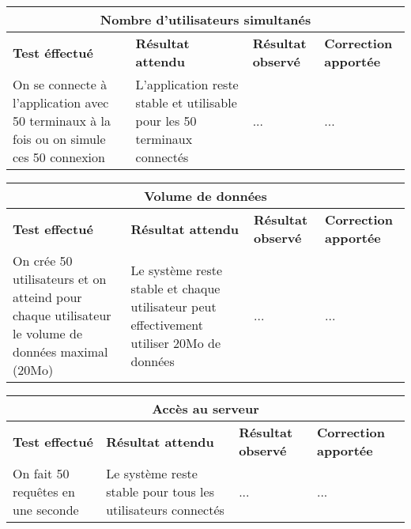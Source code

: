 \documentclass{article}
\begin{document}
  \begin{center}
    \begin{tabular}{|p{4cm}|p{4cm}|p{4cm}|p{4cm}|}
      \hline
      \multicolumn{4}{|c|}{\textbf{Nombre d'utilisateurs simultanés}} \\
      \hline
      \textbf{Test éffectué} & \textbf{Résultat attendu} & \textbf{Résultat observé} & \textbf{Correction apportée} \\
      \hline

      On se connecte à l'application avec 50 terminaux à la fois ou on simule ces 50 connexion&
      L'application reste stable et utilisable pour les 50 terminaux connectés&
      ...&
      ... \\


      \hline

    \end{tabular}
  \end{center}

  \begin{center}
    \begin{tabular}{|p{4cm}|p{4cm}|p{4cm}|p{4cm}|}
      \hline
      \multicolumn{4}{|c|}{\textbf{Volume de données}} \\
      \hline
      \textbf{Test effectué} & \textbf{Résultat attendu} & \textbf{Résultat observé} & \textbf{Correction apportée} \\
      \hline

      On crée 50 utilisateurs et on atteind pour chaque utilisateur le volume de données maximal (20Mo)&
      Le système reste stable et chaque utilisateur peut effectivement utiliser 20Mo de données&
      ...&
      ... \\


      \hline

    \end{tabular}
  \end{center}

  \begin{center}
    \begin{tabular}{|p{4cm}|p{4cm}|p{4cm}|p{4cm}|}
      \hline
      \multicolumn{4}{|c|}{\textbf{Accès au serveur}} \\
      \hline
      \textbf{Test effectué} & \textbf{Résultat attendu} & \textbf{Résultat observé} & \textbf{Correction apportée} \\
      \hline

      On fait 50 requêtes en une seconde&
      Le système reste stable pour tous les utilisateurs connectés&
      ...&
      ... \\


      \hline

    \end{tabular}
  \end{center}
\end{document}
